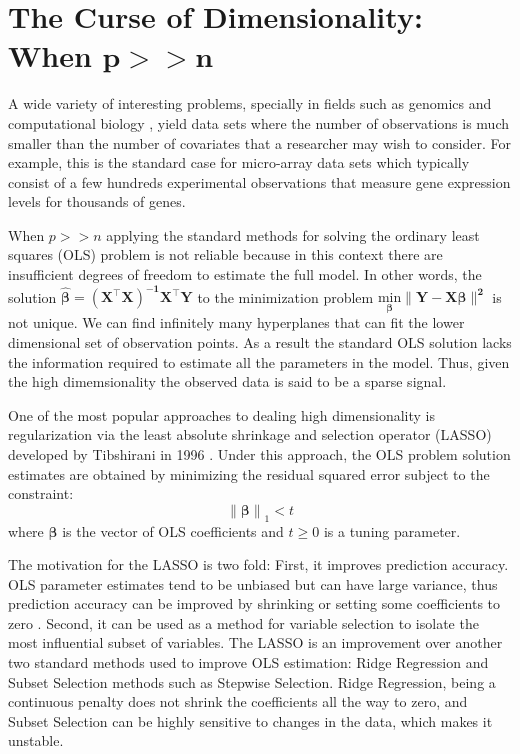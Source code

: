 \documentclass[12pt,a4paper]{article}
\begin{document}
\section{The Curse of Dimensionality: When $\mathbf{p>>n}$}
\par A wide variety of interesting problems, specially in fields such as genomics and computational biology \cite{friedman2001elements} , yield data sets where the number of observations is much smaller than the number of covariates that a researcher may wish to consider. For example, this is the standard case for micro-array data sets which typically consist of a few hundreds experimental observations that measure gene expression levels for thousands of genes.\\
\par When $p>>n$ applying the standard methods for solving the ordinary least squares (OLS) problem is not reliable because in this context there are insufficient degrees of freedom to estimate the full model. In other words, the solution $\mathbf{\hat{\boldsymbol{\beta}}=\left(X^\top X\right)^{-1}X^\top Y}$ to the minimization problem $\underset{\boldsymbol{\beta}}{\text{min}} \mathbf{\|Y - X\boldsymbol{\beta}\|^2}$ is not unique. We can find infinitely many  hyperplanes that can fit the lower dimensional set of observation points. As a result the standard OLS solution lacks the information required to estimate all the parameters in the model. Thus, given the high dimemsionality the observed data is said to be a sparse signal. \\
\par One of the most popular approaches to dealing high dimensionality is regularization via the least absolute shrinkage and selection operator (LASSO) developed by Tibshirani in 1996 \cite{tibshirani1996regression}. Under this approach, the OLS problem solution estimates are obtained by minimizing the residual squared error subject to the constraint:
\begin{equation} \label{eq:1} 
\left\|\boldsymbol{\beta}\right\|_1 < t
\end{equation}
where $\boldsymbol{\beta}$ is the vector of OLS coefficients and $t \geq 0$ is a tuning parameter. \\
\par The motivation for the LASSO is two fold: First, it improves prediction accuracy. OLS parameter estimates tend to be unbiased but can have large variance, thus prediction accuracy can be improved by shrinking or setting some coefficients to zero \cite{tibshirani1996regression}. Second, it can be used as a method for variable selection to isolate the most influential subset of variables. The LASSO is an improvement over another two standard methods used to improve OLS estimation: Ridge Regression and Subset Selection methods such as Stepwise Selection. Ridge Regression, being a continuous penalty does not shrink the coefficients all the way to zero, and Subset Selection can be highly sensitive to changes in the data, which makes it unstable. \\
\end{document}
